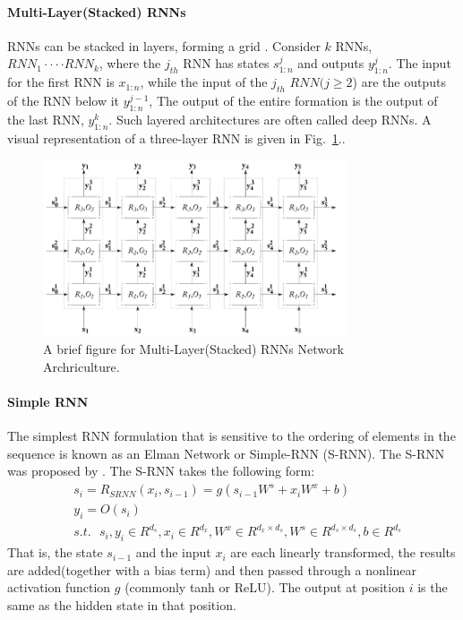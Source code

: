 \documentclass{article}
\begin{document}
\paragraph{Multi-Layer(Stacked) RNNs}
RNNs can be stacked in layers, forming a grid \citep{DBLP:conf/nips/HihiB95}. Consider $k$ RNNs, $RNN_1\cdot\cdot\cdot\cdot RNN_k$, where the $j_{th}$ RNN has states $s^j_{1:n}$ and outputs $y^j_{1:n}$. The input for the first RNN is $x_{1:n}$, while the input of the $j_{th}$ $RNN ( j \geq 2 $) are the outputs of the RNN below it $y^{j-1}_{1:n}$, The output of the entire formation is the output of the last RNN, $y^k_{1:n}$. Such layered architectures are often called deep RNNs. A visual representation of a three-layer RNN is given in Fig.~\ref{fig:Three_layers_StckedRNN_figure}..
 
 \begin{figure}[!htp]
 	\begin{centering}
 		\includegraphics[width=0.8\textwidth]{Three_layere_Deep_RNN.png}
 		\caption{A brief figure for Multi-Layer(Stacked) RNNs Network Archriculture.}
 		\label{fig:Three_layers_StckedRNN_figure} 
 	\end{centering}
 \end{figure}

\paragraph{Simple RNN}
The simplest RNN formulation that is sensitive to the ordering of elements in the sequence is known as an Elman Network or Simple-RNN (S-RNN). The S-RNN was proposed by \citep{DBLP:journals/cogsci/Elman90}. The S-RNN takes the following form:
\begin{align}
	&s_{i}=R_{SRNN}(x_i,s_{i-1})=g(s_{i-1}W^s+x_iW^x+b) \\&y_i=O(s_{i})\\ &s.t. \ \ \  s_i,y_i\in R^{d_{s}},x_i \in R^{d_{x}},W^x \in R^{d_x \times d_{s}},W^s \in R^{d_s \times d_{s}},b \in R^{d_s}
\end{align}
That is, the state $s_{i-1}$ and the input $x_i$ are each linearly transformed, the results are added(together with a bias term) and then passed through a nonlinear activation function $g$ (commonly tanh or ReLU). The output at position $i$ is the same as the hidden state in that position.
\end{document}
